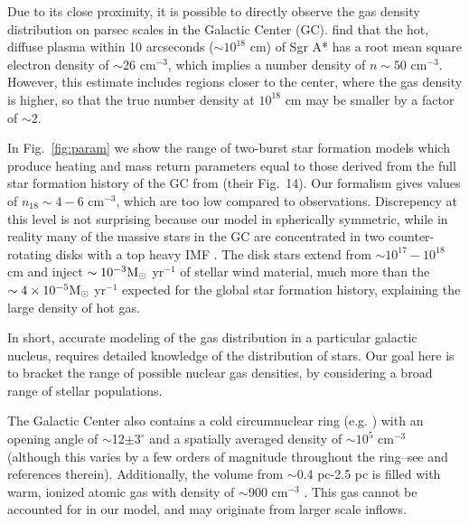 \documentclass[usenatbib,fleqn]{mnras}
\newcommand{\Msun}{{\rm M_\odot}}
\begin{document}
Due to its close proximity, it is possible to directly observe the gas
density distribution on parsec scales in the Galactic Center
(GC). \citet{Baganoff+2003} find that the hot, diffuse plasma within
10 arcseconds ($\sim 10^{18}$ cm) of Sgr A* has a root mean square
electron density of $\sim 26$ cm$^{-3}$, which implies a number
density of $n\sim 50$ cm$^{-3}$. However, this estimate includes
regions closer to the center, where the gas density is higher, so that
the true number density at $10^{18}$ cm may be smaller by a factor of
$\sim 2$.

In Fig.~\ref{fig:param} we show the range of two-burst star formation
models which produce heating and mass return parameters equal to those
derived from the full star formation history of the GC from
\citet{Pfuhl+2011} (their Fig.~14).  Our formalism gives values of
$n_{18}\sim 4-6$ cm$^{-3}$, which are too low compared to
observations.  Discrepency at this level is not surprising because our
model in spherically symmetric, while in reality many of the massive
stars in the GC are concentrated in two counter-rotating disks
\citep{Genzel+2003} with a top heavy IMF \citep{Bartko+2010}.  The
disk stars extend from $\sim 10^{17}-10^{18}$ cm and inject $\sim
10^{-3} \Msun$ yr$^{-1}$ of stellar wind material, much more than the
$\sim 4 \times 10^{-5} \Msun$ yr$^{-1}$ expected for the global star
formation history, explaining the large density of hot gas.

In short, accurate modeling of the gas distribution in a particular
galactic nucleus, requires detailed knowledge of the distribution of
stars. Our goal here is to bracket the range of possible nuclear gas
densities, by considering a broad range of stellar populations.

The Galactic Center also contains a cold circumnuclear ring
(e.g. \citealt{Becklin+1982}) with an opening angle of
$\sim$12$\pm3^{\circ}$ \citep{Lau+2013} and a spatially averaged
density of $\sim 10^{5}$ cm$^{-3}$ (although this varies by a few
orders of magnitude throughout the ring--see \citealt{Ferriere2012} and
references therein). Additionally, the volume from $\sim$0.4 pc-2.5 pc
is filled with warm, ionized atomic gas with density of $\sim 900$
cm$^{-3}$ \citep{Ferriere2012}. This gas cannot be accounted for in
our model, and may originate from larger scale inflows.
\end{document}
